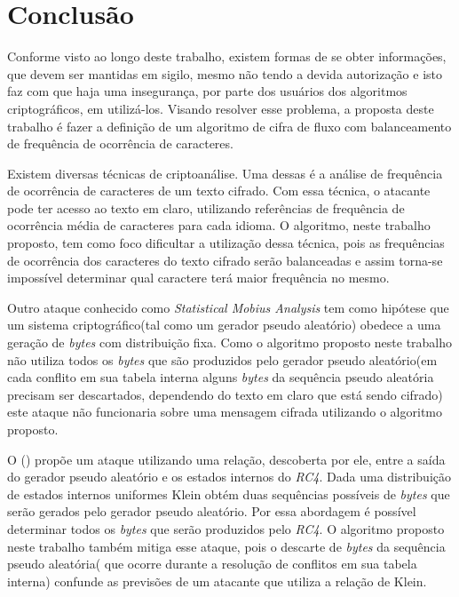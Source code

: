 \chapter{Conclusão}
\label{conclusion}


Conforme visto ao longo deste trabalho, existem formas de se obter informações, que devem ser mantidas em sigilo, mesmo não tendo a devida autorização e isto faz com que haja uma insegurança, por parte dos usuários dos algoritmos criptográficos, em utilizá-los. Visando resolver esse problema, a proposta deste trabalho é fazer a definição de um algoritmo de cifra de fluxo com balanceamento de frequência de ocorrência de caracteres.

Existem diversas técnicas de criptoanálise. Uma dessas é a análise de frequência de ocorrência de caracteres de um texto cifrado. Com essa técnica, o atacante pode ter acesso ao texto em claro, utilizando referências de frequência de ocorrência média de caracteres para cada idioma. O algoritmo, neste trabalho proposto, tem como foco dificultar a utilização dessa técnica, pois as frequências de ocorrência dos caracteres do texto cifrado serão balanceadas e assim torna-se impossível determinar qual caractere terá maior frequência no mesmo.

Outro ataque conhecido como \textit{Statistical Mobius Analysis} tem como hipótese  que um sistema criptográfico(tal como um gerador pseudo aleatório) obedece a uma geração de \textit{bytes} com distribuição fixa\cite{eric-filiol}. Como o algoritmo proposto neste trabalho não utiliza todos os \textit{bytes} que são produzidos pelo gerador pseudo aleatório(em cada conflito em sua tabela interna alguns \textit{bytes} da sequência pseudo aleatória precisam ser descartados, dependendo do texto em claro que está sendo cifrado) este ataque não funcionaria sobre uma mensagem cifrada utilizando o algoritmo proposto.

O \citeauthor{andreas-klein} (\citeyear{andreas-klein}) propõe um ataque utilizando uma relação, descoberta por ele, entre a saída do gerador pseudo aleatório e os estados internos do \textit{RC4}. Dada uma distribuição de estados internos uniformes Klein obtém duas sequências possíveis de \textit{bytes} que serão gerados pelo gerador pseudo aleatório. Por essa abordagem é possível determinar todos os \textit{bytes} que serão produzidos pelo \textit{RC4}. O algoritmo proposto neste trabalho também mitiga esse ataque, pois o descarte de \textit{bytes} da sequência pseudo aleatória( que ocorre durante a resolução de conflitos em sua tabela interna) confunde as previsões de um atacante que utiliza a relação de Klein.
 
